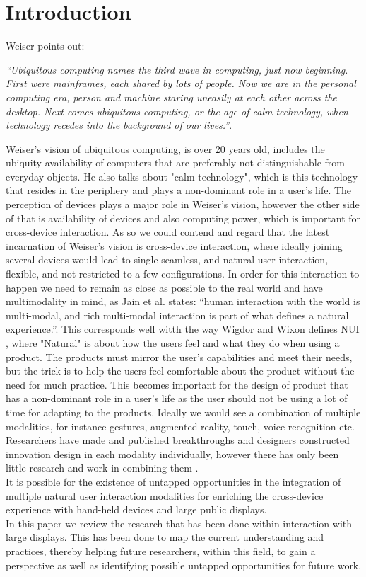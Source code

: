 \section{Introduction}
Weiser\cite{Weiser:1991} points out:
 
{\em``Ubiquitous computing names the third wave in computing, just now beginning. First were mainframes, each shared by lots of people. Now we are in the personal computing era, person and machine staring uneasily at each other across the desktop. Next comes ubiquitous computing, or the age of calm technology, when technology recedes into the background of our lives.''}.

Weiser's vision of ubiquitous computing, is over 20 years old, includes the ubiquity availability of computers that are preferably not distinguishable from everyday objects. He also talks about "calm technology", which is this technology that resides in the periphery and plays a non-dominant role in a user's life. The perception of devices plays a major role in Weiser's vision, however the other side of that is availability of devices and also computing power, which is important for cross-device interaction. As so we could contend and regard that the latest incarnation of Weiser's vision is cross-device interaction, where ideally joining several devices would lead to single seamless, and natural user interaction, flexible, and not restricted to a few configurations\cite{Radle:2015}.
In order for this interaction to happen we need to remain as close as possible to the real world and have multimodality in mind, as Jain et al. states: ``human interaction with the world is multi-modal, and rich multi-modal interaction is part of what defines a natural experience.''\cite{Jain:2011}. 
This corresponds well witth the way Wigdor and Wixon defines NUI , where "Natural" is about how the users feel and what they do when using a product. The products must mirror the user's capabilities and meet their needs, but the trick is to help the users feel comfortable about the product without the need for much practice\cite{Wigdor:2011}. This becomes important for the design of product that has a non-dominant role in a user's life as the user should not be using a lot of time for adapting to the products.   
Ideally we would see a combination of multiple modalities, for instance gestures, augmented reality, touch, voice recognition etc. 
Researchers have made and published breakthroughs and designers constructed innovation design in each modality individually, however there has only been little research and work in combining them \cite{Jain:2011}. \\

It is possible for the existence of untapped opportunities in the integration of multiple natural user interaction modalities for enriching the cross-device experience with hand-held devices and large public displays. \\

In this paper we review the research that has been done within interaction with large displays. 
This has been done to map the current understanding and practices, thereby helping future researchers, within this field, to gain a perspective as well as identifying possible untapped opportunities for future work.